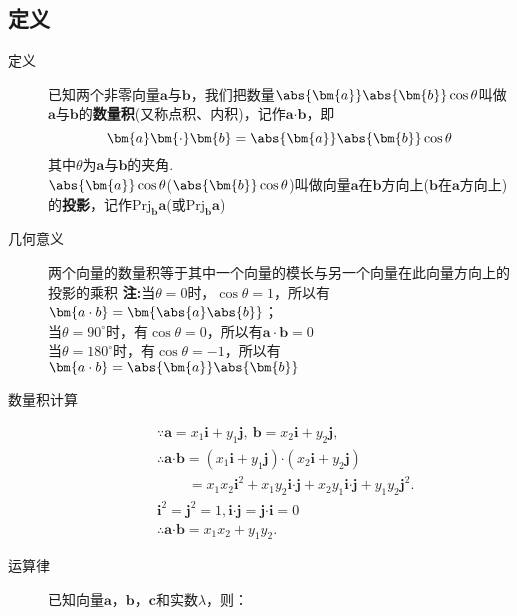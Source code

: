 \begin{Theorem}[平面向量基本定理]
  \subsection{定义}
    \begin{description}
      \item[定义] 已知两个非零向量$ \bm{a} $与$\bm{b}$，我们把数量$ \abs{\bm{a}}\abs{\bm{b}}\cos\theta $叫做$ \bm{a} $与$ \bm{b} $的\textbf{数量积}(又称点积、内积)，记作$ \bm{a}\bm{\cdot}\bm{b} $，即\[\bm{a}\bm{\cdot}\bm{b}=\abs{\bm{a}}\abs{\bm{b}}\cos\theta\]
      其中$ \theta $为$ \bm{a} $与$ \bm{b} $的夹角.\\
      $\abs{\bm{a}}\cos\theta$($\abs{\bm{b}}\cos\theta$)叫做向量$\bm a$在$\bm b$方向上($\bm b$在$\bm a$方向上)的\textbf{投影}，记作$\mathrm{Prj}_{\bm b}{\bm a}$(或$\mathrm{Prj}_{\bm b}{\bm a}$)
      \item[几何意义] 两个向量的数量积等于其中一个向量的模长与另一个向量在此向量方向上的投影的乘积%
      {\kaishu \textbf{注:}当$ \theta=0 $时，$ \cos\theta=1 $，所以有$ \bm{a\cdot b}=\bm{\abs{a}\abs{b}} $；\\\phantom{注:\ }当$ \theta=90^{\circ} $时，有$ \cos\theta =0$，所以有$ \bm{a\cdot b}=0 $ \\\phantom{注:\ }当$ \theta=180^{\circ} $时，有$ \cos\theta =-1$，所以有$ \bm{a\cdot b}=\abs{\bm{a}}\abs{\bm{b}} $   }
      \item[数量积计算]
      \begin{equation*}
      \begin{aligned}
      &\because \bm{a}=x_1\bm{i}+y_1\bm{j},~\bm{b}=x_2\bm{i}+y_2\bm{j},\\
      &\therefore \bm{a}\bm{\cdot}\bm{b}=(x_1\bm{i}+y_1\bm{j})\bm{\cdot}(x_2\bm{i}+y_2\bm{j})\\
      &\phantom{\therefore\bm{a}\bm{\cdot}\bm{b}~}=x_1x_2\bm{i}^2+x_1y_2\bm{i}\bm{\cdot}\bm{j}+x_2y_1\bm{i}\bm{\cdot}\bm{j}+y_1y_2\bm{j}^2.\\
      & \bm{i}^2=\bm{j}^2=1,\bm{i}\bm{\cdot}\bm{j}=\bm{j}\bm{\cdot}\bm{i}=0\\
      &\therefore \bm{a}\bm{\cdot}\bm{b}=x_1x_2+y_1y_2.
      \end{aligned}
      \end{equation*}
      \item[运算律]已知向量$\bm a$，$\bm b$，$\bm c$和实数$\lambda$，则：
        \begin{itemize}%

\end{itemize}
\end{description}
\end{Theorem}

